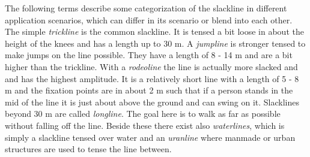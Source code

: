 The following terms describe some categorization of the slackline in different application scenarios, which can differ in its scenario or blend into each other. The simple \textit{trickline} is the common slackline. It is tensed a bit loose in about the height of the knees and has a length up to 30 m. A \textit{jumpline} is stronger tensed to make jumps on the line possible. They have a length of 8 - 14 m and are a bit higher than the trickline. With a \textit{rodeoline} the line is actually more slacked and and has the highest amplitude. It is a relatively short line with a length of 5 - 8 m and the fixation points are in about 2 m such that if a person stands in the mid of the line it is just about above the ground and can swing on it. Slacklines beyond 30 m are called \textit{longline}. The goal here is to walk as far as possible without falling off the line. Beside these there exist also \textit{waterlines}, which is simply a slackline tensed over water and an \textit{uranline} where manmade or urban structures are used to tense the line between.

\begin{comment}
\begin{itemize}
\item What is it actually
\item „The fascination behind it“ —> Optional?
\item Different ways to slackline \textbf{ \todo{figures}}

\begin{itemize}
\item Trickline/Normal --> up to 30m, loose tensed
\item Jumpline 	--> up to 30 m, hard tensed
\item Longline --> more than 30m but no constraint in length
\item Highline --> up in the height and long
\item Rodeoline --> loose tensed
\item Waterline --> over water

\end{itemize}

\item Approach scenarios
\begin{itemize}
\item Hobby
\item Competition
\item Tricklining
\item Walking
\end{itemize}

\item Tension
\begin{itemize}
\item Strong
\item Loose
\end{itemize}

\end{itemize}
\end{comment}